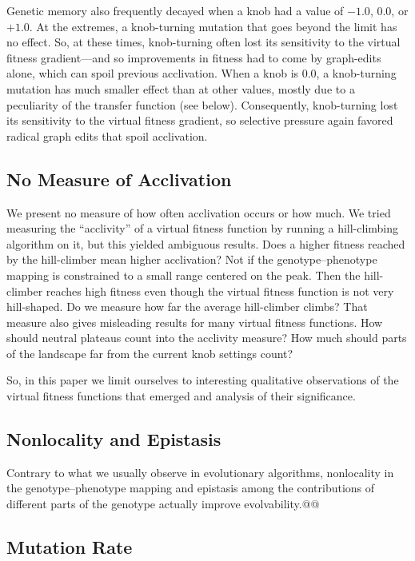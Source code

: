 \documentclass[letterpaper]{article}
\begin{document}
Genetic memory also frequently decayed when a knob had a value of $-1.0$,
$0.0$, or $+1.0$. At the extremes, a knob-turning mutation that goes beyond the
limit has no effect. So, at these times, knob-turning often lost its
sensitivity to the virtual fitness gradient---and so improvements in fitness
had to come by graph-edits alone, which can spoil previous acclivation. When a
knob is 0.0, a knob-turning mutation has much smaller effect than at other
values, mostly due to a peculiarity of the transfer function (see below).
Consequently, knob-turning lost its sensitivity to the virtual fitness
gradient, so selective pressure again favored radical graph edits that spoil
acclivation.

\subsection{No Measure of Acclivation}

We present no measure of how often acclivation occurs or how much. We tried
measuring the ``acclivity'' of a virtual fitness function by running a
hill-climbing algorithm on it, but this yielded ambiguous results. Does a
higher fitness reached by the hill-climber mean higher acclivation? Not if the
genotype--phenotype mapping is constrained to a small range centered on the
peak. Then the hill-climber reaches high fitness even though the virtual
fitness function is not very hill-shaped. Do we measure how far the average
hill-climber climbs?  That measure also gives misleading results for many
virtual fitness functions. How should neutral plateaus count into the acclivity
measure? How much should parts of the landscape far from the current knob
settings count?

So, in this paper we limit ourselves to interesting qualitative observations
of the virtual fitness functions that emerged and analysis of their
significance.

\subsection{Nonlocality and Epistasis}

Contrary to what we usually observe in evolutionary algorithms, nonlocality in
the genotype--phenotype mapping and epistasis among the contributions of
different parts of the genotype actually improve evolvability.@@

\subsection{Mutation Rate}
\end{document}
